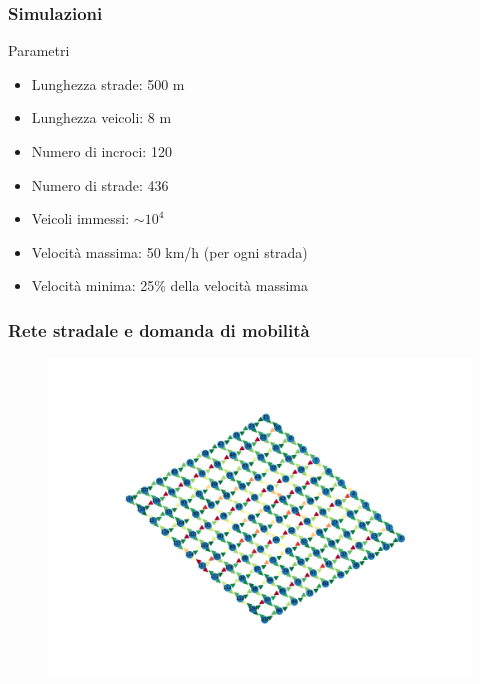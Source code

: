 \documentclass[
	11pt, %
]{beamer}
\begin{document}
\begin{frame}
	\frametitle{Simulazioni} %
	
		\begin{block}{Parametri}
			\begin{itemize}
				\item Lunghezza strade: 500 m
				\item Lunghezza veicoli: 8 m
				\item Numero di incroci: 120
				\item Numero di strade: 436
				\item Veicoli immessi: $\sim 10^4$
				\item Velocit\`a massima: 50 km/h (per ogni strada)
				\item Velocit\`a minima: 25\% della velocit\`a massima
			\end{itemize}
			
		\end{block}	
\end{frame}

\begin{frame}
	\frametitle{Rete stradale e domanda di mobilit\`a} %
	\centering
	\begin{figure}
		\includegraphics[width=.8\textwidth, trim={12.5cm 8cm 10cm 8cm},clip]{free_flow.png}
	\end{figure}
\end{frame}
\end{document}
